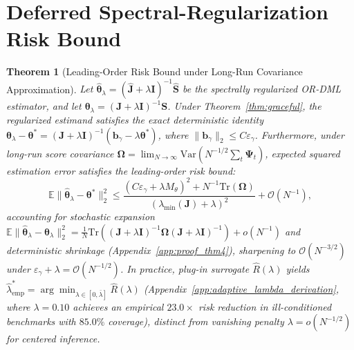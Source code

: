 \documentclass[twoside]{article}
\newtheorem{theorem}{Theorem}
\theoremstyle{definition}
\newcommand{\E}{\mathbb{E}}
\newcommand{\Var}{\mathrm{Var}}
\begin{document}
\section{Deferred Spectral-Regularization Risk Bound}
\label{app:spectral_full}
\begin{theorem}[Leading-Order Risk Bound under Long-Run Covariance Approximation]
\label{thm:spectral}
Let $\hat{\boldsymbol{\theta}}_\lambda = (\hat{\boldsymbol{J}} + \lambda \boldsymbol{I})^{-1}\hat{\boldsymbol{S}}$ be the spectrally regularized OR-DML estimator, and let $\boldsymbol{\theta}_\lambda = (\boldsymbol{J} + \lambda \boldsymbol{I})^{-1}\boldsymbol{S}$. Under Theorem~\ref{thm:graceful}, the regularized estimand satisfies the exact deterministic identity $\boldsymbol{\theta}_\lambda - \boldsymbol{\theta}^* = (\boldsymbol{J} + \lambda \boldsymbol{I})^{-1} \left( \boldsymbol{b}_\gamma - \lambda \boldsymbol{\theta}^* \right)$, where $\|\boldsymbol{b}_\gamma\|_2 \le C \varepsilon_\gamma$. Furthermore, under long-run score covariance $\boldsymbol{\Omega} = \lim_{N \to \infty} \Var(N^{-1/2}\sum_t \boldsymbol{\Psi}_t)$, expected squared estimation error satisfies the leading-order risk bound:
\begin{equation}
    \E\|\hat{\boldsymbol{\theta}}_\lambda - \boldsymbol{\theta}^*\|_2^2 \le \frac{(C \varepsilon_\gamma + \lambda M_\theta)^2 + N^{-1}\mathrm{Tr}(\boldsymbol{\Omega})}{(\lambda_{\min}(\boldsymbol{J}) + \lambda)^2} + \mathcal{O}(N^{-1}),
\end{equation}
accounting for stochastic expansion $\E\|\hat{\boldsymbol{\theta}}_\lambda - \boldsymbol{\theta}_\lambda\|_2^2 = \frac{1}{N}\mathrm{Tr}((\boldsymbol{J}+\lambda\boldsymbol{I})^{-1}\boldsymbol{\Omega}(\boldsymbol{J}+\lambda\boldsymbol{I})^{-1}) + o(N^{-1})$ and deterministic shrinkage (Appendix~\ref{app:proof_thm4}), sharpening to $\mathcal{O}(N^{-3/2})$ under $\varepsilon_\gamma + \lambda = \mathcal{O}(N^{-1/2})$. In practice, plug-in surrogate $\hat{R}(\lambda)$ yields $\hat{\lambda}^*_{\mathrm{emp}} = \arg\min_{\lambda \in [0, \bar{\lambda}]} \hat{R}(\lambda)$ (Appendix~\ref{app:adaptive_lambda_derivation}, where $\lambda = 0.10$ achieves an empirical $23.0\times$ risk reduction in ill-conditioned benchmarks with $85.0\%$ coverage), distinct from vanishing penalty $\lambda = o(N^{-1/2})$ for centered inference.
\end{theorem}
\end{document}
